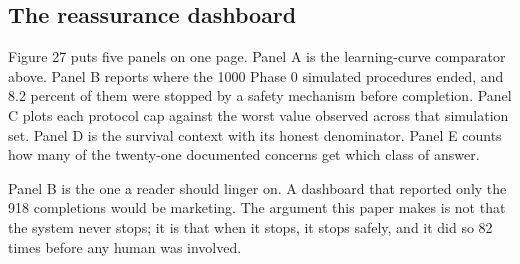 \vspace{0.30em}

\subsection{The reassurance dashboard}

Figure 27 puts five panels on one page. Panel A is the learning-curve
comparator above. Panel B reports where the 1000 Phase 0 simulated procedures
ended, and 8.2 percent of them were stopped by a safety mechanism before
completion. Panel C plots each protocol cap against the worst value observed
across that simulation set. Panel D is the survival context with its honest
denominator. Panel E counts how many of the twenty-one documented concerns get
which class of answer.

Panel B is the one a reader should linger on. A dashboard that reported only the
918 completions would be marketing. The argument this paper makes is not that
the system never stops; it is that when it stops, it stops safely, and it did so
82 times before any human was involved.

